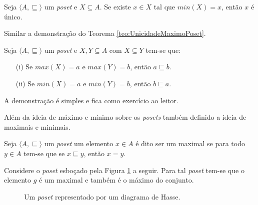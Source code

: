 \begin{teorema}\label{teo:UnicidadeMinimoPoset}
	Seja $\langle A, \sqsubseteq \rangle$ um \textit{poset} e $X \subseteq A$. Se existe $x \in X$ tal que $min(X) = x$, então $x$ é único.
\end{teorema}

\begin{prova}
	Similar a demonstração do Teorema \ref{teo:UnicidadeMaximoPoset}.
\end{prova}

\begin{teorema}\label{teo:MonotonicidadeInclusaoMaxMin}
	Seja $\langle A, \sqsubseteq \rangle$ um \textit{poset} e $X, Y \subseteq A$ com $X \subseteq Y$ tem-se que:
	\begin{itemize}
		\item[(i)] Se $max(X) = a$ e $max(Y) = b$, então $a \sqsubseteq b$.
		\item[(ii)] Se $min(X) = a$ e $min(Y) = b$, então $b \sqsubseteq a$.
	\end{itemize}
\end{teorema}

\begin{prova}
	A demonstração é simples e fica como exercício ao leitor.
\end{prova}

Além da ideia de máximo e mínimo sobre os \textit{posets} também definido a ideia de maximais e minimais.

\begin{definicao}\label{def:MaximaisPoset}
	Seja $\langle A, \sqsubseteq \rangle$ um \textit{poset}  um elemento $x \in A$ é dito ser um maximal se para todo $y \in A$ tem-se que se $x \sqsubseteq y$, então $x = y$.
\end{definicao}

\begin{exemplo}
  Considere o \textit{poset} esboçado pela Figura \ref{fig:DiagramaHasse7} a seguir. Para tal \textit{poset} tem-se que o elemento $g$ é um maximal e também é o máximo do conjunto.
\end{exemplo}

\begin{figure}[h]
  \centering
  \caption{Um \textit{poset} representado por um diagrama de Hasse.}
  \label{fig:DiagramaHasse7}
\end{figure}

